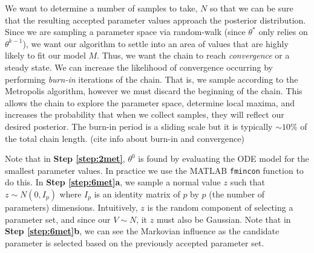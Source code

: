 \documentclass{article}
\begin{document}
\par We want to determine a number of samples to take, $N$ so that we can be sure that the resulting accepted parameter values approach the posterior distribution. Since we are sampling a parameter space via random-walk (since $\theta^*$ only relies on $\theta^{k-1}$), we want our algorithm to settle into an area of values that are highly likely to fit our model $M$. Thus, we want the chain to reach \emph{convergence} or a steady state. We can increase the likelihood of convergence occurring by performing \emph{burn-in} iterations of the chain. That is, we sample according to the Metropolis algorithm, however we must discard the beginning of the chain. This allows the chain to explore the parameter space, determine local maxima, and increases the probability that when we collect samples, they will reflect our desired posterior. The burn-in period is a sliding scale but it is typically  $\sim 10\%$ of the total chain length. (cite info about burn-in and convergence)
\par Note that in \textbf{Step \ref{step:2met}}, $\theta^0$ is found by evaluating the ODE model for the smallest parameter values. In practice we use the MATLAB \texttt{fmincon} function to do this. In \textbf{Step \ref{step:6met}a}, we sample a normal value $z$ such that $z \sim N(0,I_p)$ where $I_p$ is an identity matrix of $p$ by $p$ (the number of parameters) dimensions. Intuitively, $z$ is the random component of selecting a parameter set, and since our $V \sim N$, it $z$ must also be Gaussian. Note that in \textbf{Step \ref{step:6met}b}, we can see the Markovian influence as the candidate parameter is selected based on the previously accepted parameter set.
\end{document}
